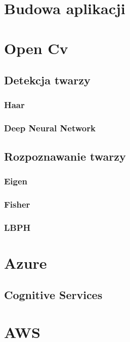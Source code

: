 \section{Budowa aplikacji}

\section{Open Cv}

\subsection{Detekcja twarzy}
\subsubsection{Haar}
\subsubsection{Deep Neural Network}

\subsection{Rozpoznawanie twarzy}
\subsubsection{Eigen}
\subsubsection{Fisher}
\subsubsection{LBPH}

\section{Azure}
\subsection{Cognitive Services}

\section{AWS}

